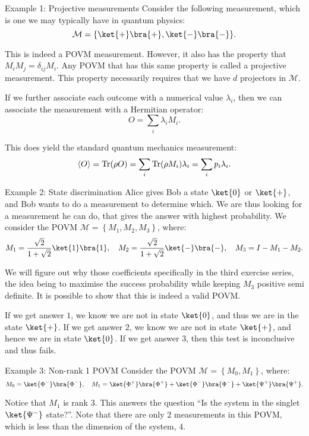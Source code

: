 \documentclass[a4paper]{article}
\begin{document}
\begin{parag}{Example 1: Projective measurements}
    Consider the following measurement, which is one we may typically have in quantum physics:
    \[\mathcal{M} = \left\{\ket{+}\bra{+}, \ket{-}\bra{-}\right\}.\]

    This is indeed a POVM measurement. However, it also has the property that $M_i M_j = \delta_{ij} M_i$. Any POVM that has this same property is called a projective measurement. This property necessarily requires that we have $d$ projectors in $\mathcal{M}$. 

    If we further associate each outcome with a numerical value $\lambda_i$, then we can associate the measurement with a Hermitian operator: 
    \[O = \sum_{i} \lambda_i M_i.\]
    
    This does yield the standard quantum mechanics measurement: 
    \[\left\langle O \right\rangle = \Tr\left(\rho O\right) = \sum_{i} \Tr\left(\rho M_i\right) \lambda_i = \sum_{i} p_i \lambda_i.\]
\end{parag}

\begin{parag}{Example 2: State discrimination}
    Alice gives Bob a state $\ket{0}$ or $\ket{+}$, and Bob wants to do a measurement to determine which. We are thus looking for a measurement he can do, that gives the answer with highest probability. We consider the POVM $\mathcal{M} = \left\{M_1, M_2, M_3\right\}$, where:
    \[M_1 = \frac{\sqrt{2}}{1 + \sqrt{2}} \ket{1}\bra{1}, \mathspace M_2 = \frac{\sqrt{2}}{1 + \sqrt{2}} \ket{-}\bra{-}, \mathspace M_3 = I - M_1 - M_2.\]

    We will figure out why those coefficients specifically in the third exercise series, the idea being to maximise the success probability while keeping $M_3$ positive semi definite. It is possible to show that this is indeed a valid POVM.

    If we get answer $1$, we know we are not in state $\ket{0}$, and thus we are in the state $\ket{+}$. If we get answer $2$, we know we are not in state $\ket{+}$, and hence we are in state $\ket{0}$. If we get answer $3$, then this test is inconclusive and thus fails.
\end{parag}

\begin{parag}{Example 3: Non-rank 1 POVM}
    Consider the POVM $\mathcal{M} = \left\{M_0, M_1\right\}$, where:
    \[M_0 = \ket{\Phi^-}\bra{\Phi^-}, \mathspace M_1 = \ket{\Phi^+}\bra{\Phi^+} + \ket{\Phi^-}\bra{\Phi^-} + \ket{\Psi^+}\bra{\Psi^+}.\]

    Notice that $M_1$ is rank $3$. This answers the question ``Is the system in the singlet $\ket{\Psi^-}$ state?''. Note that there are only 2 measurements in this POVM, which is less than the dimension of the system, $4$.
\end{parag}
\end{document}
